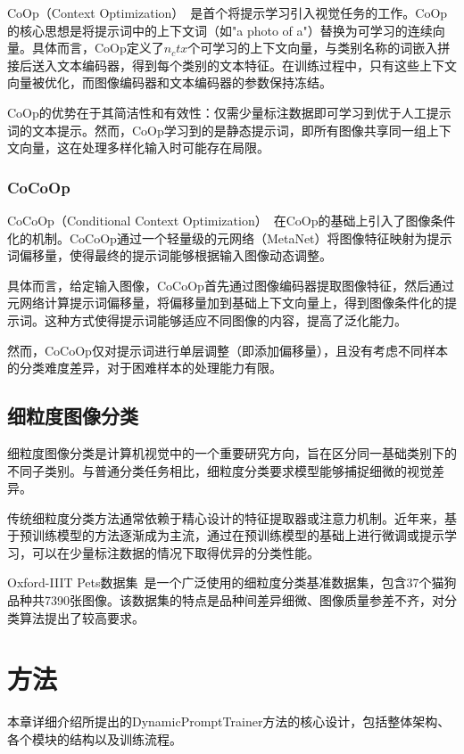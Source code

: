 \documentclass{HDU-Bachelor-Thesis}
\begin{document}
CoOp（Context Optimization）~\cite{coop2022}是首个将提示学习引入视觉任务的工作。CoOp的核心思想是将提示词中的上下文词（如"a photo of a"）替换为可学习的连续向量。具体而言，CoOp定义了$n_ctx$个可学习的上下文向量，与类别名称的词嵌入拼接后送入文本编码器，得到每个类别的文本特征。在训练过程中，只有这些上下文向量被优化，而图像编码器和文本编码器的参数保持冻结。

CoOp的优势在于其简洁性和有效性：仅需少量标注数据即可学习到优于人工提示词的文本提示。然而，CoOp学习到的是静态提示词，即所有图像共享同一组上下文向量，这在处理多样化输入时可能存在局限。

\subsubsection{CoCoOp}

CoCoOp（Conditional Context Optimization）~\cite{cocoop2022}在CoOp的基础上引入了图像条件化的机制。CoCoOp通过一个轻量级的元网络（MetaNet）将图像特征映射为提示词偏移量，使得最终的提示词能够根据输入图像动态调整。

具体而言，给定输入图像，CoCoOp首先通过图像编码器提取图像特征，然后通过元网络计算提示词偏移量，将偏移量加到基础上下文向量上，得到图像条件化的提示词。这种方式使得提示词能够适应不同图像的内容，提高了泛化能力。

然而，CoCoOp仅对提示词进行单层调整（即添加偏移量），且没有考虑不同样本的分类难度差异，对于困难样本的处理能力有限。

\subsection{细粒度图像分类}

细粒度图像分类是计算机视觉中的一个重要研究方向，旨在区分同一基础类别下的不同子类别。与普通分类任务相比，细粒度分类要求模型能够捕捉细微的视觉差异。

传统细粒度分类方法通常依赖于精心设计的特征提取器或注意力机制。近年来，基于预训练模型的方法逐渐成为主流，通过在预训练模型的基础上进行微调或提示学习，可以在少量标注数据的情况下取得优异的分类性能。

Oxford-IIIT Pets数据集~\cite{parkhi2012cats}是一个广泛使用的细粒度分类基准数据集，包含37个猫狗品种共7390张图像。该数据集的特点是品种间差异细微、图像质量参差不齐，对分类算法提出了较高要求。

\section{方法}

本章详细介绍所提出的DynamicPromptTrainer方法的核心设计，包括整体架构、各个模块的结构以及训练流程。
\end{document}
